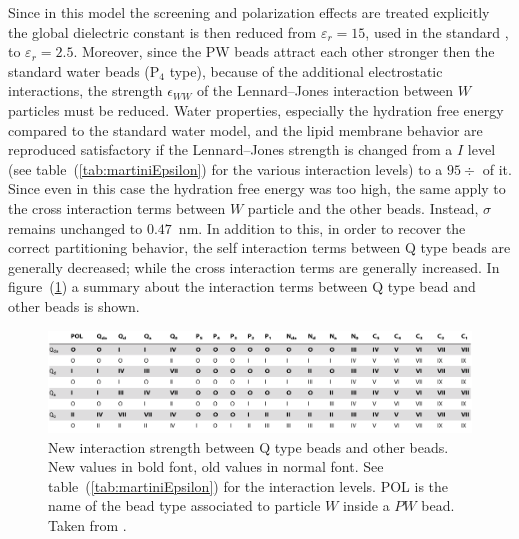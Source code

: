 Since in this model the screening and polarization effects are treated explicitly the global dielectric constant
is then reduced from $\varepsilon_r = 15$, used in the standard \martini, to $\varepsilon_r = 2.5$. Moreover,
since the \ac{PW} beads attract each other stronger then the standard water beads (P$_4$ type), because of the additional electrostatic interactions, the strength $\epsilon_{WW}$ of the Lennard--Jones interaction between $W$ particles must be reduced. Water properties, especially the hydration free energy compared to the standard water model, and the lipid membrane behavior are reproduced satisfactory if the Lennard--Jones strength is changed from a
$I$ level (see table~(\ref{tab:martiniEpsilon}) for the various interaction levels) to a $95\div$ of it. Since even in this case the hydration free energy was too high, the same apply to the cross interaction terms between $W$ particle and the other \martini beads. Instead, $\sigma$ remains unchanged to $0.47$~nm. In addition to this, in order to recover the correct partitioning behavior, the self interaction terms between Q type beads are generally decreased; while the cross interaction terms are generally increased. In figure~(\ref{fig:PWMartini}) a summary about the interaction terms between Q type bead and other beads is shown.
\begin{figure}[!ht]
	\centering
	\includegraphics[width=\textwidth]{./img/PWMartini}
	\caption{New interaction strength between Q type beads and other beads. New values in bold font, old values in normal font. See table~(\ref{tab:martiniEpsilon}) for the interaction levels. POL is the name of the \martini bead type associated to particle $W$ inside a $PW$ bead. Taken from \cite{PW}.}
	\label{fig:PWMartini}
\end{figure}


